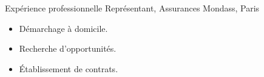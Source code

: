 \begin{rubric}{Expérience professionnelle}
\entry*[1958 -- 1983] Représentant, Assurances Mondass, Paris
                      \begin{itemize}
                      \item Démarchage à domicile.
                      \item Recherche d'opportunités.
                      \item Établissement de contrats.
                      \end{itemize}
\end{rubric}
